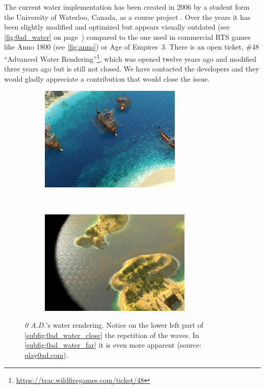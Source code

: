 The current water implementation has been created in 2006 by a student form the
University of Waterloo, Canada, as a course project \autocite{zaharia2006cs}.
Over the years it has been slightly modified and optimized but appears visually
outdated (see \autoref{fig:0ad_water} on page~\pageref{fig:0ad_water}) compared
to the one used in commercial RTS games like Anno 1800 (see
\autoref{fig:anno}) or Age of Empires~3. There is an open ticket, \#48
``Advanced Water
Rendering''\footnote{\url{https://trac.wildfiregames.com/ticket/48}}, which was
opened twelve years ago and modified three years ago but is still not closed.
We have contacted the developers and they would gladly appreciate a contribution
that would close the issue.

\begin{figure}[h!]
    \centering
    \begin{subfigure}[h]{\textwidth}
        \centering
        \includegraphics[height=5cm]{figures/0ad_water-specular.jpg}
        \label{subfig:0ad_water_close}
    \end{subfigure}\\%
    \begin{subfigure}[h]{\textwidth}
        \centering
        \includegraphics[height=5cm]{figures/0ad_cycladic_arcgipelago_6.jpg}
        \label{subfig:0ad_water_far}
    \end{subfigure}
    \caption{\textit{0 A.D.}'s water rendering. Notice on the lower left part
        of \autoref{subfig:0ad_water_close} the repetition of the waves.
        In \autoref{subfig:0ad_water_far} it is even more apparent (source:
        \url{play0ad.com}).}\label{fig:0ad_water}
\end{figure}
